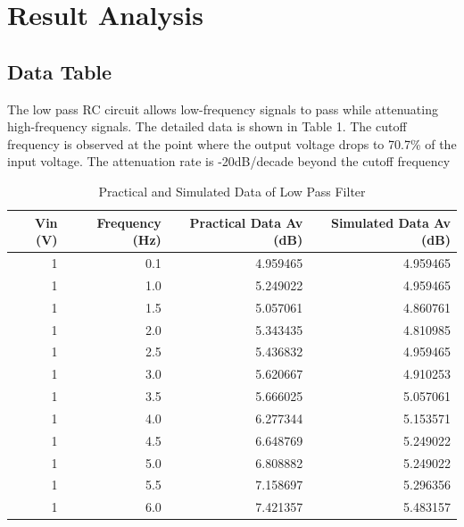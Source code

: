\documentclass[12pt]{article}
\begin{document}
\section{Result Analysis}

\subsection{Data Table}
The low pass RC circuit allows low-frequency signals to pass while attenuating high-frequency signals. The detailed data is shown in Table 1. The cutoff frequency is observed at the point where the output voltage drops to 70.7\% of the input voltage. The attenuation rate is -20dB/decade beyond the cutoff frequency

\begin{table}[h!]
    \centering
    \caption{Practical and Simulated Data of Low Pass Filter}
    \begin{tabular}{rrrr}
        \hline
        Vin (V) &  Frequency (Hz) &  Practical Data Av (dB) &  Simulated Data Av (dB) \\
        \hline
        1 &             0.1 &                 4.959465 &                 4.959465 \\
        1 &             1.0 &                 5.249022 &                 4.959465 \\
        1 &             1.5 &                 5.057061 &                 4.860761 \\
        1 &             2.0 &                 5.343435 &                 4.810985 \\
        1 &             2.5 &                 5.436832 &                 4.959465 \\
        1 &             3.0 &                 5.620667 &                 4.910253 \\
        1 &             3.5 &                 5.666025 &                 5.057061 \\
        1 &             4.0 &                 6.277344 &                 5.153571 \\
        1 &             4.5 &                 6.648769 &                 5.249022 \\
        1 &             5.0 &                 6.808882 &                 5.249022 \\
        1 &             5.5 &                 7.158697 &                 5.296356 \\
        1 &             6.0 &                 7.421357 &                 5.483157 \\

\end{tabular}
\end{table}
\end{document}
